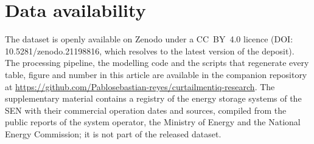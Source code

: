 \section*{Data availability}
The dataset is openly available on Zenodo under a CC~BY~4.0 licence (DOI: 10.5281/zenodo.21198816, which resolves to the latest version of the deposit). The processing pipeline, the modelling code and the scripts that regenerate every table, figure and number in this article are available in the companion repository at \url{https://github.com/Pablosebastian-reyes/curtailmentiq-research}. The supplementary material contains a registry of the energy storage systems of the SEN with their commercial operation dates and sources, compiled from the public reports of the system operator, the Ministry of Energy and the National Energy Commission; it is not part of the released dataset.
